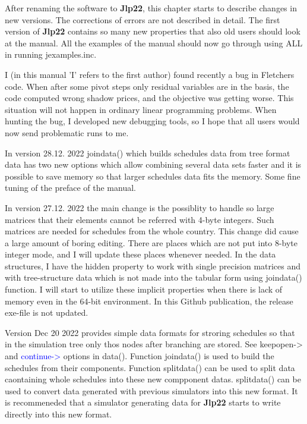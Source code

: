 After renaming the software to \textbf{Jlp22}, this chapter starts to describe changes in new versions. 
The corrections of errors are not described in detail. The first version of \textbf{Jlp22} contains so many new properties that also old users 
should look at the manual. All the examples of the manual should now go through using ALL in running 
jexamples.inc. 
 
I (in this manual 'I' refers to the first author) found recently a bug in Fletchers code. When after some pivot steps only residual variables 
are in the basis, the code computed wrong shadow prices, and the objective was getting worse. 
This situation will not happen in ordinary linear programming problems. When hunting the bug, I developed new 
debugging tools, so I hope that all users would now send problematic 
runs to me. 
 
In version 28.12. 2022 \textcolor{VioletRed}{joindata}() which builds schedules data from tree format data has two new options 
which allow combining several data sets faster and it is possible to save memory so that larger 
schedules data fits the memory. Some fine tuning of the preface of the manual. 
 
In version 27.12. 2022 the main change is the possiblity to handle so large matrices that their 
elements cannot be referred with 4-byte integers. Such matrices are needed for schedules from the whole 
country. This change did cause a large amount of boring editing. 
There are places which are not put into 8-byte integer mode, and I will update 
these places whenever needed. 
In the data structures, I have the hidden property to work with single precision matrices and with tree-structure 
data which is not made into the tabular form using \textcolor{VioletRed}{joindata}() function. I will start to 
utilize these implicit properties when there is lack of memory even in the 64-bit environment. 
In this Github publication, 
the release exe-file is not updated. 
 
Version Dec 20 2022 provides simple data formats for stroring schedules so that in the simulation tree only thos 
nodes after branching are stored. See keepopen-> and \textcolor{blue}{continue->} options in \textcolor{VioletRed}{data}(). Function \textcolor{VioletRed}{joindata}() is 
used to build the schedules from their components. Function \textcolor{VioletRed}{splitdata}() can be used to split data caontaining whole 
schedules into these new compponent datas. \textcolor{VioletRed}{splitdata}() can be used to convert data generated with previous simulators 
into this new format. It is recommeneded that a simulator generating data for \textbf{Jlp22} 
starts to write directly into this new format. 
 

